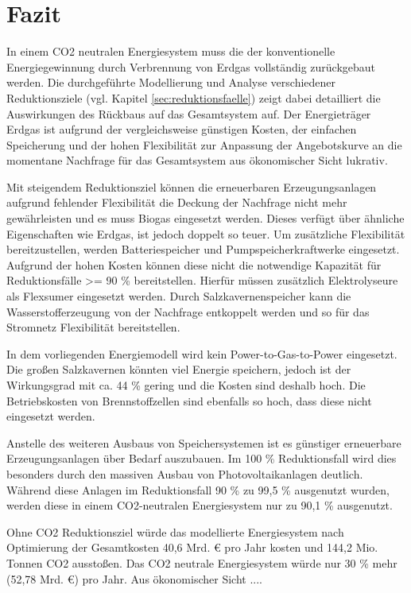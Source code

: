\section{Fazit}
In einem CO2 neutralen Energiesystem muss die der konventionelle Energiegewinnung durch Verbrennung von Erdgas vollständig zurückgebaut werden. Die durchgeführte Modellierung und Analyse verschiedener Reduktionsziele (vgl. Kapitel \ref{sec:reduktionsfaelle}) zeigt dabei detailliert die Auswirkungen des Rückbaus auf das Gesamtsystem auf.
Der Energieträger Erdgas ist aufgrund der vergleichsweise günstigen Kosten, der einfachen Speicherung und der hohen Flexibilität zur Anpassung der Angebotskurve an die momentane Nachfrage für das Gesamtsystem aus ökonomischer Sicht lukrativ. 

Mit steigendem Reduktionsziel können die erneuerbaren Erzeugungsanlagen aufgrund fehlender Flexibilität die Deckung der Nachfrage nicht mehr gewährleisten und es muss Biogas eingesetzt werden. Dieses verfügt über ähnliche Eigenschaften wie Erdgas, ist jedoch doppelt so teuer. Um zusätzliche Flexibilität bereitzustellen, werden Batteriespeicher und Pumpspeicherkraftwerke eingesetzt. Aufgrund der hohen Kosten können diese nicht die notwendige Kapazität für Reduktionsfälle >= 90 \% bereitstellen.
Hierfür müssen zusätzlich Elektrolyseure als Flexsumer eingesetzt werden. Durch Salzkavernenspeicher kann die Wasserstofferzeugung von der Nachfrage entkoppelt werden und so für das Stromnetz Flex\-ibilität bereitstellen.  

In dem vorliegenden Energiemodell wird kein Power-to-Gas-to-Power eingesetzt. Die großen Salzkavernen könnten viel Energie speichern, jedoch ist der Wirkungsgrad mit ca. 44 \% gering und die Kosten sind deshalb hoch. Die Betriebskosten von Brennstoffzellen sind ebenfalls so hoch, dass diese nicht eingesetzt werden. 

Anstelle des weiteren Ausbaus von Speichersystemen ist es günstiger erneuerbare Erzeugungsanlagen über Bedarf auszubauen. Im 100 \% Reduktionsfall wird dies besonders durch den massiven Ausbau von Photovoltaikanlagen deutlich. Während diese Anlagen im Reduktionsfall 90 \% zu 99,5 \% ausgenutzt wurden, werden diese in einem CO2-neutralen Energiesystem nur zu 90,1 \% ausgenutzt.  

Ohne CO2 Reduktionsziel würde das modellierte Energiesystem nach Optimierung der Gesamtkosten 40,6 Mrd. € pro Jahr kosten und 144,2 Mio. Tonnen CO2 ausstoßen. Das CO2 neutrale Energiesystem würde nur 30 \% mehr (52,78 Mrd. €) pro Jahr. Aus ökonomischer Sicht .... 

